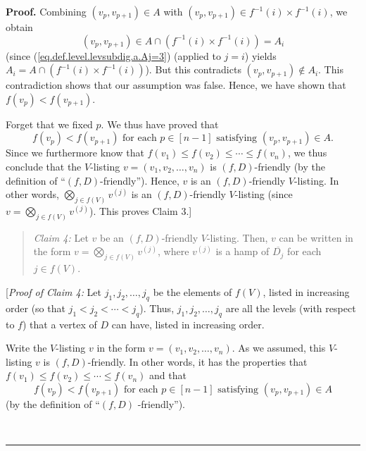 \documentclass[numbers=enddot,12pt,final,onecolumn,notitlepage]{scrartcl}%
\numberwithin{exer}{section}
\theoremstyle{definition}
\newenvironment{statement}{\begin{quote}}{\end{quote}}
\newenvironment{proof}[1][Proof]{\noindent\textbf{#1.} }{\ \rule{0.5em}{0.5em}}
\newenvironment{verlong}{}{}
\begin{document}
\begin{verlong}
\begin{proof}
Combining $\left(  v_{p},v_{p+1}\right)  \in A$ with $\left(  v_{p}%
,v_{p+1}\right)  \in f^{-1}\left(  i\right)  \times f^{-1}\left(  i\right)  $,
we obtain%
\[
\left(  v_{p},v_{p+1}\right)  \in A\cap\left(  f^{-1}\left(  i\right)  \times
f^{-1}\left(  i\right)  \right)  =A_{i}%
\]
(since (\ref{eq.def.level.levsubdig.a.Aj=3}) (applied to $j=i$) yields
$A_{i}=A\cap\left(  f^{-1}\left(  i\right)  \times f^{-1}\left(  i\right)
\right)  $). But this contradicts $\left(  v_{p},v_{p+1}\right)  \notin A_{i}%
$. This contradiction shows that our assumption was false. Hence, we have
shown that $f\left(  v_{p}\right)  <f\left(  v_{p+1}\right)  $.

Forget that we fixed $p$. We thus have proved that%
\[
f\left(  v_{p}\right)  <f\left(  v_{p+1}\right)  \text{ for each }p\in\left[
n-1\right]  \text{ satisfying }\left(  v_{p},v_{p+1}\right)  \in A.
\]
Since we furthermore know that $f\left(  v_{1}\right)  \leq f\left(
v_{2}\right)  \leq\cdots\leq f\left(  v_{n}\right)  $, we thus conclude that
the $V$-listing $v=\left(  v_{1},v_{2},\ldots,v_{n}\right)  $ is $\left(
f,D\right)  $-friendly (by the definition of \textquotedblleft$\left(
f,D\right)  $-friendly\textquotedblright). Hence, $v$ is an $\left(
f,D\right)  $-friendly $V$-listing. In other words, $\bigotimes\limits_{j\in
f\left(  V\right)  }v^{\left(  j\right)  }$ is an $\left(  f,D\right)
$-friendly $V$-listing (since $v=\bigotimes\limits_{j\in f\left(  V\right)
}v^{\left(  j\right)  }$). This proves Claim 3.]

\begin{statement}
\textit{Claim 4:} Let $v$ be an $\left(  f,D\right)  $-friendly $V$-listing.
Then, $v$ can be written in the form $v=\bigotimes\limits_{j\in f\left(
V\right)  }v^{\left(  j\right)  }$, where $v^{\left(  j\right)  }$ is a hamp
of $\overline{D_{j}}$ for each $j\in f\left(  V\right)  $.
\end{statement}

[\textit{Proof of Claim 4:} Let $j_{1},j_{2},\ldots,j_{q}$ be the elements of
$f\left(  V\right)  $, listed in increasing order (so that $j_{1}<j_{2}%
<\cdots<j_{q}$). Thus, $j_{1},j_{2},\ldots,j_{q}$ are all the levels (with
respect to $f$) that a vertex of $D$ can have, listed in increasing order.

Write the $V$-listing $v$ in the form $v=\left(  v_{1},v_{2},\ldots
,v_{n}\right)  $. As we assumed, this $V$-listing $v$ is $\left(  f,D\right)
$-friendly. In other words, it has the properties that $f\left(  v_{1}\right)
\leq f\left(  v_{2}\right)  \leq\cdots\leq f\left(  v_{n}\right)  $ and that%
\begin{equation}
f\left(  v_{p}\right)  <f\left(  v_{p+1}\right)  \text{ for each }p\in\left[
n-1\right]  \text{ satisfying }\left(  v_{p},v_{p+1}\right)  \in A
\label{pf.lem.friendlies-by-f.c4.1}%
\end{equation}
(by the definition of \textquotedblleft$\left(  f,D\right)  $%
-friendly\textquotedblright).


\end{proof}
\end{verlong}
\end{document}
